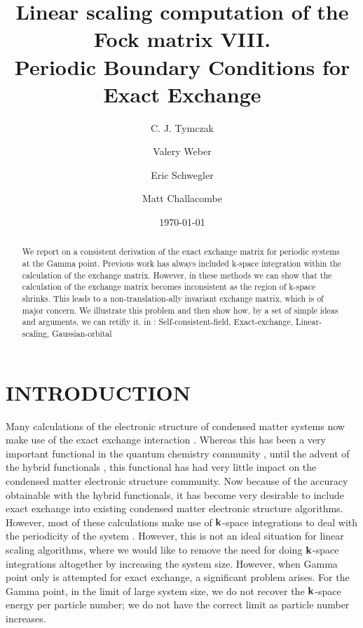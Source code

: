 \documentclass[prb,aps,nobibnotes,twocolumn,doublespace,twocolumngrid,superbib]{revtex4}
\begin{document}
\title{Linear scaling computation of the Fock matrix VIII. \\
       Periodic Boundary Conditions for Exact Exchange}

\author{C. J. Tymczak}
\author{Valery Weber}
\author{Eric Schwegler}
\author{Matt Challacombe}


\date{\today}

\begin{abstract}
We report on a consistent derivation of the exact exchange matrix for periodic
systems at the Gamma point. Previous work has always included k-space integration 
within the calculation of the exchange matrix. However, in  these methods
we can show that the calculation of the exchange matrix becomes inconsistent as the
region of k-space shrinks. This leads to a non-translation-ally invariant exchange matrix,
which is of major concern. We illustrate this problem and then show how, by a set of
simple ideas and arguments, we can retifiy it.
%
 in
: Self-consistent-field, Exact-exchange, Linear-scaling, Gaussian-orbital 
%
\end{abstract}

\pacs{}

\maketitle



\section{INTRODUCTION}
Many calculations of the electronic structure of condensed matter systems now make use
of the exact exchange interaction 
\cite{CPisani80,REvarestov83,MCausa88,JAlmlof94,RDovesi00}. 
Whereas this has been a very
important functional in the quantum chemistry community 
\cite{PLowdin55,py,ASzabo89}, 
until the advent of the hybrid functionals 
\cite{Gill92,Becke93,ABecke96,Adamo99}, 
this functional has had very little impact on the
condensed matter electronic structure community. Now because of the accuracy obtainable with
the hybrid functionals, it has become very desirable to include exact exchange into
existing condensed matter electronic structure algorithms. 
However, most of these calculations make use of ${\bf k}$-space integrations to 
deal with the periodicity of the system \cite{RDovesi00}. However, this is not an ideal situation 
for linear scaling algorithms, where we would like to remove the need for doing
${\bf k}$-space integrations altogether by increasing the system size. 
However, when Gamma point only is attempted for exact exchange, a 
significant problem arises. For the Gamma point, in the limit of large system size,
we do not recover the ${\bf k}$-space energy per particle number; we do not have the correct
limit as particle number increases.  
%
\end{document}
